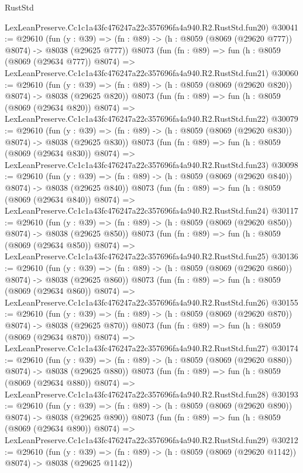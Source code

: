 \begin{lexlean}{RustStd}
\begin{coremodule}
    LexLeanPreserve.Cc1c1a43fc476247a22c357696fa4a940.R2.RustStd.fun20)
@30041 := @29610
    (fun (y : @39) => (fn : @89) -> (h : @8059 (@8069 (@29620 @777)) @8074) -> @8038 (@29625 @777))
    @8073
    (fun (fn : @89) =>
    fun (h : @8059 (@8069 (@29634 @777)) @8074) =>
    LexLeanPreserve.Cc1c1a43fc476247a22c357696fa4a940.R2.RustStd.fun21)
@30060 := @29610
    (fun (y : @39) => (fn : @89) -> (h : @8059 (@8069 (@29620 @820)) @8074) -> @8038 (@29625 @820))
    @8073
    (fun (fn : @89) =>
    fun (h : @8059 (@8069 (@29634 @820)) @8074) =>
    LexLeanPreserve.Cc1c1a43fc476247a22c357696fa4a940.R2.RustStd.fun22)
@30079 := @29610
    (fun (y : @39) => (fn : @89) -> (h : @8059 (@8069 (@29620 @830)) @8074) -> @8038 (@29625 @830))
    @8073
    (fun (fn : @89) =>
    fun (h : @8059 (@8069 (@29634 @830)) @8074) =>
    LexLeanPreserve.Cc1c1a43fc476247a22c357696fa4a940.R2.RustStd.fun23)
@30098 := @29610
    (fun (y : @39) => (fn : @89) -> (h : @8059 (@8069 (@29620 @840)) @8074) -> @8038 (@29625 @840))
    @8073
    (fun (fn : @89) =>
    fun (h : @8059 (@8069 (@29634 @840)) @8074) =>
    LexLeanPreserve.Cc1c1a43fc476247a22c357696fa4a940.R2.RustStd.fun24)
@30117 := @29610
    (fun (y : @39) => (fn : @89) -> (h : @8059 (@8069 (@29620 @850)) @8074) -> @8038 (@29625 @850))
    @8073
    (fun (fn : @89) =>
    fun (h : @8059 (@8069 (@29634 @850)) @8074) =>
    LexLeanPreserve.Cc1c1a43fc476247a22c357696fa4a940.R2.RustStd.fun25)
@30136 := @29610
    (fun (y : @39) => (fn : @89) -> (h : @8059 (@8069 (@29620 @860)) @8074) -> @8038 (@29625 @860))
    @8073
    (fun (fn : @89) =>
    fun (h : @8059 (@8069 (@29634 @860)) @8074) =>
    LexLeanPreserve.Cc1c1a43fc476247a22c357696fa4a940.R2.RustStd.fun26)
@30155 := @29610
    (fun (y : @39) => (fn : @89) -> (h : @8059 (@8069 (@29620 @870)) @8074) -> @8038 (@29625 @870))
    @8073
    (fun (fn : @89) =>
    fun (h : @8059 (@8069 (@29634 @870)) @8074) =>
    LexLeanPreserve.Cc1c1a43fc476247a22c357696fa4a940.R2.RustStd.fun27)
@30174 := @29610
    (fun (y : @39) => (fn : @89) -> (h : @8059 (@8069 (@29620 @880)) @8074) -> @8038 (@29625 @880))
    @8073
    (fun (fn : @89) =>
    fun (h : @8059 (@8069 (@29634 @880)) @8074) =>
    LexLeanPreserve.Cc1c1a43fc476247a22c357696fa4a940.R2.RustStd.fun28)
@30193 := @29610
    (fun (y : @39) => (fn : @89) -> (h : @8059 (@8069 (@29620 @890)) @8074) -> @8038 (@29625 @890))
    @8073
    (fun (fn : @89) =>
    fun (h : @8059 (@8069 (@29634 @890)) @8074) =>
    LexLeanPreserve.Cc1c1a43fc476247a22c357696fa4a940.R2.RustStd.fun29)
@30212 := @29610
    (fun (y : @39) =>
    (fn : @89) -> (h : @8059 (@8069 (@29620 @1142)) @8074) -> @8038 (@29625 @1142))

\end{coremodule}
\end{lexlean}
